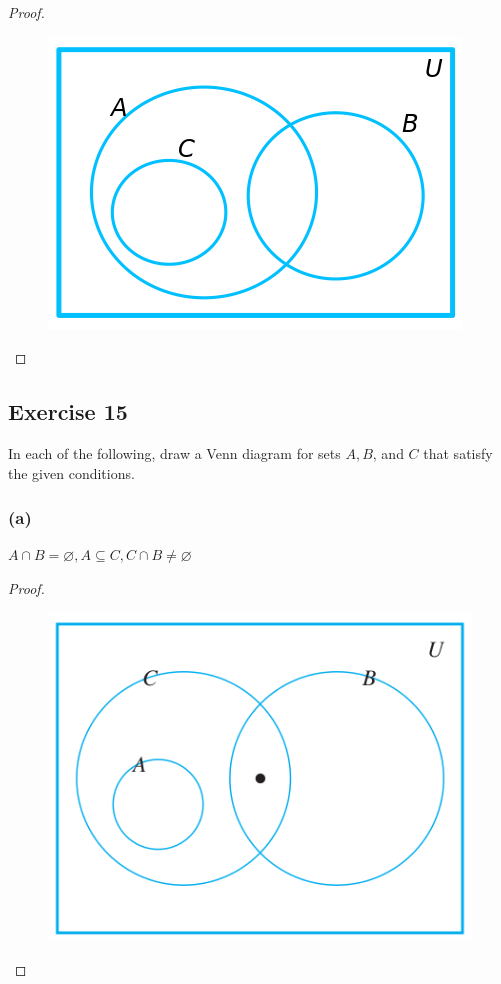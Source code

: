 \documentclass[14pt]{extarticle}
\newcommand{\es}{\varnothing}
\begin{document}
\begin{proof}
\begin{figure}[ht!]
\centering
\includegraphics[scale=0.4]{../images/6.1.14.b.png}
\end{figure}
\end{proof}

\subsection{Exercise 15}
In each of the following, draw a Venn diagram for sets $A, B$, and $C$ that satisfy the given conditions.

\subsubsection{(a)}
\(A \cap B = \es, A \subseteq C, C \cap B \neq \es\)

\begin{proof}
\begin{figure}[ht!]
\centering
\includegraphics[scale=0.4]{../images/6.1.15.a.png}
\end{figure}
\end{proof}
\end{document}
